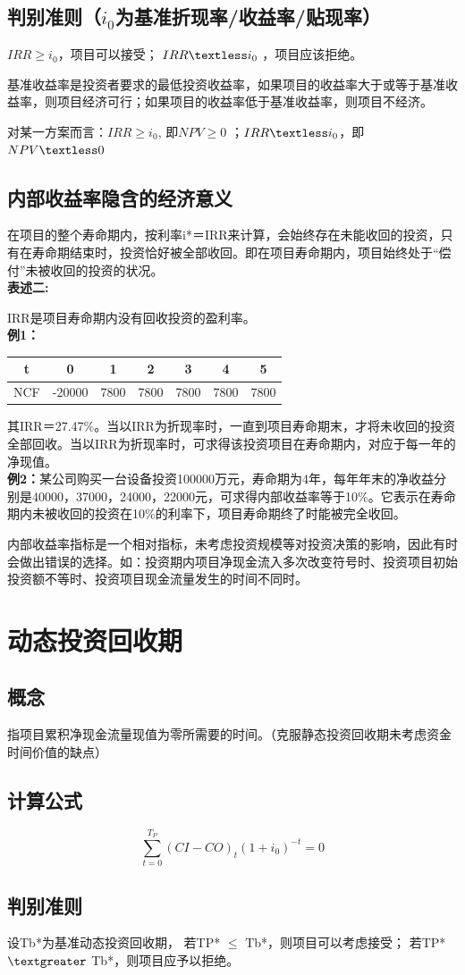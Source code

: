 \subsection{判别准则（$i_0$为基准折现率/收益率/贴现率）}
$IRR \geq i_0$，项目可以接受；
$IRR \textless i_0$ ，项目应该拒绝。

基准收益率是投资者要求的最低投资收益率，如果项目的收益率大于或等于基准收益率，则项目经济可行；如果项目的收益率低于基准收益率，则项目不经济。

对某一方案而言：$IRR \geq i_0$, 即$NPV \geq 0$ ；$IRR \textless i_0$，即$NPV \textless 0$

\subsection{内部收益率隐含的经济意义}

在项目的整个寿命期内，按利率i*＝IRR来计算，会始终存在未能收回的投资，只有在寿命期结束时，投资恰好被全部收回。即在项目寿命期内，项目始终处于“偿付”未被收回的投资的状况。\\
\textbf{表述二:}

IRR是项目寿命期内没有回收投资的盈利率。\\
\textbf{例1：}
\begin{table}[H]
\centering
\begin{tabular}{|c|c|c|c|c|c|c|}
\hline
t   & 0 & 1 & 2 & 3 & 4  & 5  \\ \hline
NCF   & -20000 & 7800  & 7800  & 7800  & 7800  & 7800   \\ \hline
\end{tabular}
\end{table}
其IRR＝27.47\%。当以IRR为折现率时，一直到项目寿命期末，才将未收回的投资全部回收。当以IRR为折现率时，可求得该投资项目在寿命期内，对应于每一年的净现值。\\
\textbf{例2：}某公司购买一台设备投资100000万元，寿命期为4年，每年年末的净收益分别是40000，37000，24000，22000元，可求得内部收益率等于10\%。它表示在寿命期内未被收回的投资在10\%的利率下，项目寿命期终了时能被完全收回。

内部收益率指标是一个相对指标，未考虑投资规模等对投资决策的影响，因此有时会做出错误的选择。如：投资期内项目净现金流入多次改变符号时、投资项目初始投资额不等时、投资项目现金流量发生的时间不同时。

\section{动态投资回收期}
\subsection{概念}
指项目累积净现金流量现值为零所需要的时间。（克服静态投资回收期未考虑资金时间价值的缺点）

\subsection{计算公式}
$$\sum_{t=0}^{T_P}(CI-CO)_t(1+i_0)^{-t}=0$$

\subsection{判别准则}
设Tb*为基准动态投资回收期，
若TP* $\leq$ Tb*，则项目可以考虑接受；
若TP* $\textgreater$ Tb*，则项目应予以拒绝。

